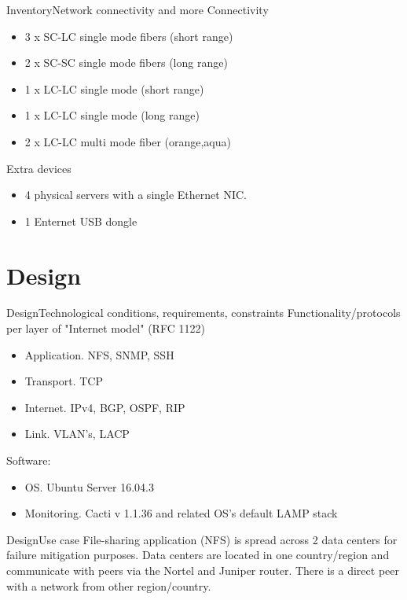 \documentclass{beamer}
\begin{document}
\begin{frame}{Inventory}{Network connectivity and more}
Connectivity
\begin{itemize}
    \item 3 x SC-LC single mode fibers (short range)
    \item 2 x SC-SC single mode fibers (long range)
    \item 1 x LC-LC single mode (short range)
    \item 1 x LC-LC single mode (long range)
    \item 2 x LC-LC multi mode fiber (orange,aqua)
\end{itemize}
Extra devices
\begin{itemize}
    \item 4 physical servers with a single Ethernet NIC.
    \item 1 Enternet USB dongle
\end{itemize}
\end{frame}

\section{Design}
\begin{frame}{Design}{Technological conditions, requirements, constraints}
Functionality/protocols per layer of "Internet model" (RFC 1122)
\begin{itemize}
    \item Application. NFS, SNMP, SSH
    \item Transport. TCP
    \item Internet. IPv4, BGP, OSPF, RIP
    \item Link. VLAN's, LACP
\end{itemize}
Software:
\begin{itemize}
    \item OS. Ubuntu Server 16.04.3 
    \item Monitoring. Cacti v 1.1.36 and related OS's default LAMP stack
\end{itemize}

\end{frame}

\begin{frame}{Design}{Use case}
File-sharing application (NFS) is spread across 2 data centers for failure mitigation purposes. Data centers are located in one country/region and communicate with peers via the Nortel and Juniper router. There is a direct peer with a network from other region/country.
\end{frame}
\end{document}
